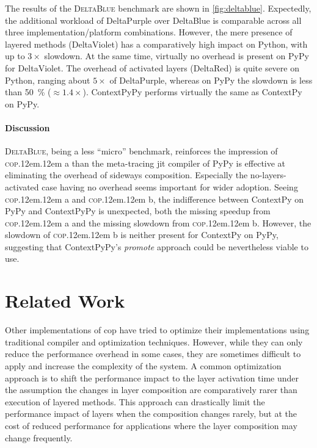 \documentclass[preprint,english,10pt,nonatbib]{sigplanconf}
\DeclareRobustCommand*\copa{\textsc{cop}\kern .12em\oldstylenums{09}\kern .12em a\xspace}
\DeclareRobustCommand*\copb{\textsc{cop}\kern .12em\oldstylenums{09}\kern .12em b\xspace}
\DeclareRobustCommand*\deltablue{\textsc{DeltaBlue}\xspace}
\begin{document}
\medskip\noindent %
The results of the \deltablue benchmark are shown in \autoref{fig:deltablue}.
Expectedly, the additional workload of DeltaPurple over DeltaBlue is comparable
across all three implementation/platform combinations. However, the mere
presence of layered methods (DeltaViolet) has a comparatively high impact on
Python, with up to \(3\times\)
slowdown. At the same time, virtually no overhead is present on PyPy for
DeltaViolet. The overhead of activated layers (DeltaRed) is quite severe on
Python, ranging about \(5\times\)
of DeltaPurple, whereas on PyPy the slowdown is less than \SI{50}{\percent}
(\(\approx 1.4\times\)). ContextPyPy performs virtually the same as ContextPy
on PyPy.

\paragraph{Discussion} \deltablue, being a less ``micro'' benchmark, reinforces
the impression of \copa than the meta-tracing \ac{jit} compiler of PyPy is
effective at eliminating the overhead of sideways composition. Especially the
no-layers-activated case having no overhead seems important for wider adoption.
Seeing \copa and \copb, the indifference between ContextPy on PyPy and
ContextPyPy is unexpected, both the missing speedup from \copa and the missing
slowdown from \copb. However, the slowdown of \copb is neither present for
ContextPy on PyPy, suggesting that ContextPyPy's \emph{promote} approach could
be nevertheless viable to use.


\section{Related Work}

Other implementations of \acrlong{cop} have tried to optimize their
implementations using traditional compiler and optimization techniques. However,
while they can only reduce the performance overhead in some cases, they are
sometimes difficult to apply and increase the complexity of the system. A common
optimization approach is to shift the performance impact to the layer activation
time under the assumption the changes in layer composition are comparatively
rarer than execution of layered methods. This approach can drastically limit the
performance impact of layers when the composition changes rarely, but at the
cost of reduced performance for applications where the layer composition may
change frequently.
\end{document}
